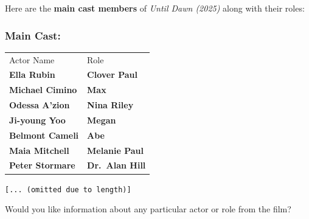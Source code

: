 \documentclass[fleqn,moreauthors,10pt]{ds_report}
\begin{document}
\begin{appendix}
\begin{tcolorbox}[breakable,float*,width=\textwidth,title=Conversation Example with Advanced Qwen]
\begin{adjustwidth}{20pt}{0pt}
Here are the \textbf{main cast members} of \emph{Until Dawn (2025)}
along with their roles:

\subsubsection*{Main Cast:}

\begin{tabular}{ l l }
	Actor Name & Role \\
	\textbf{Ella Rubin} & \textbf{Clover Paul} \\
	\textbf{Michael Cimino} & \textbf{Max} \\
	\textbf{Odessa A'zion} & \textbf{Nina Riley} \\
	\textbf{Ji-young Yoo} & \textbf{Megan} \\
	\textbf{Belmont Cameli} & \textbf{Abe} \\
	\textbf{Maia Mitchell} & \textbf{Melanie Paul} \\
	\textbf{Peter Stormare} & \textbf{Dr.~Alan Hill} \\
\end{tabular}

\texttt{[... (omitted due to length)]} 

Would you like information about any particular actor or role from the
film?

\end{adjustwidth}

\end{tcolorbox}


\end{appendix}
\end{document}
